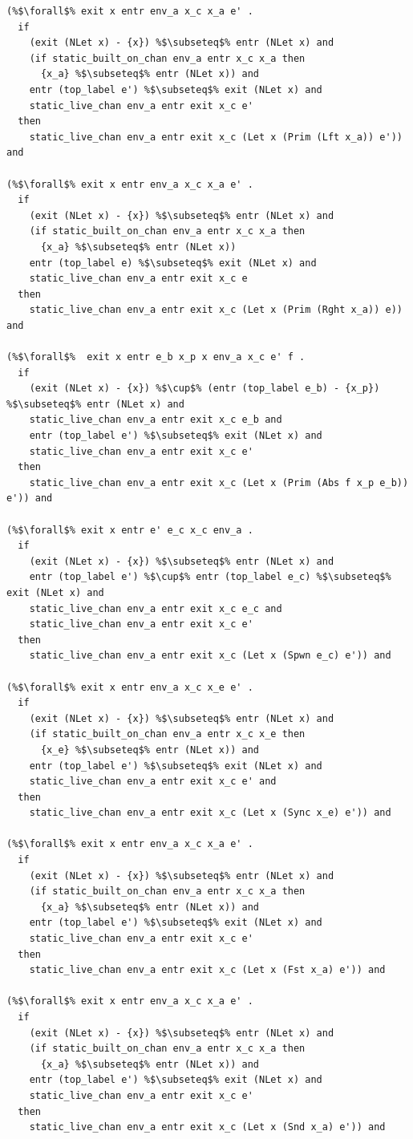 \documentclass{article}
\begin{document}
\begin{lstlisting}[language=logic, escapechar=\%]
(%$\forall$% exit x entr env_a x_c x_a e' . 
  if
    (exit (NLet x) - {x}) %$\subseteq$% entr (NLet x) and
    (if static_built_on_chan env_a entr x_c x_a then
      {x_a} %$\subseteq$% entr (NLet x)) and
    entr (top_label e') %$\subseteq$% exit (NLet x) and
    static_live_chan env_a entr exit x_c e'
  then
    static_live_chan env_a entr exit x_c (Let x (Prim (Lft x_a)) e')) and

(%$\forall$% exit x entr env_a x_c x_a e' . 
  if
    (exit (NLet x) - {x}) %$\subseteq$% entr (NLet x) and
    (if static_built_on_chan env_a entr x_c x_a then
      {x_a} %$\subseteq$% entr (NLet x))
    entr (top_label e) %$\subseteq$% exit (NLet x) and
    static_live_chan env_a entr exit x_c e
  then
    static_live_chan env_a entr exit x_c (Let x (Prim (Rght x_a)) e)) and

(%$\forall$%  exit x entr e_b x_p x env_a x_c e' f . 
  if
    (exit (NLet x) - {x}) %$\cup$% (entr (top_label e_b) - {x_p}) %$\subseteq$% entr (NLet x) and
    static_live_chan env_a entr exit x_c e_b and
    entr (top_label e') %$\subseteq$% exit (NLet x) and
    static_live_chan env_a entr exit x_c e'
  then
    static_live_chan env_a entr exit x_c (Let x (Prim (Abs f x_p e_b)) e')) and

(%$\forall$% exit x entr e' e_c x_c env_a .
  if
    (exit (NLet x) - {x}) %$\subseteq$% entr (NLet x) and
    entr (top_label e') %$\cup$% entr (top_label e_c) %$\subseteq$% exit (NLet x) and
    static_live_chan env_a entr exit x_c e_c and
    static_live_chan env_a entr exit x_c e'
  then
    static_live_chan env_a entr exit x_c (Let x (Spwn e_c) e')) and

(%$\forall$% exit x entr env_a x_c x_e e' .
  if
    (exit (NLet x) - {x}) %$\subseteq$% entr (NLet x) and
    (if static_built_on_chan env_a entr x_c x_e then
      {x_e} %$\subseteq$% entr (NLet x)) and
    entr (top_label e') %$\subseteq$% exit (NLet x) and
    static_live_chan env_a entr exit x_c e' and
  then
    static_live_chan env_a entr exit x_c (Let x (Sync x_e) e')) and

(%$\forall$% exit x entr env_a x_c x_a e' .
  if
    (exit (NLet x) - {x}) %$\subseteq$% entr (NLet x) and
    (if static_built_on_chan env_a entr x_c x_a then
      {x_a} %$\subseteq$% entr (NLet x)) and
    entr (top_label e') %$\subseteq$% exit (NLet x) and
    static_live_chan env_a entr exit x_c e'
  then
    static_live_chan env_a entr exit x_c (Let x (Fst x_a) e')) and

(%$\forall$% exit x entr env_a x_c x_a e' .
  if 
    (exit (NLet x) - {x}) %$\subseteq$% entr (NLet x) and
    (if static_built_on_chan env_a entr x_c x_a then
      {x_a} %$\subseteq$% entr (NLet x)) and
    entr (top_label e') %$\subseteq$% exit (NLet x) and
    static_live_chan env_a entr exit x_c e'
  then
    static_live_chan env_a entr exit x_c (Let x (Snd x_a) e')) and


\end{lstlisting}
\end{document}
